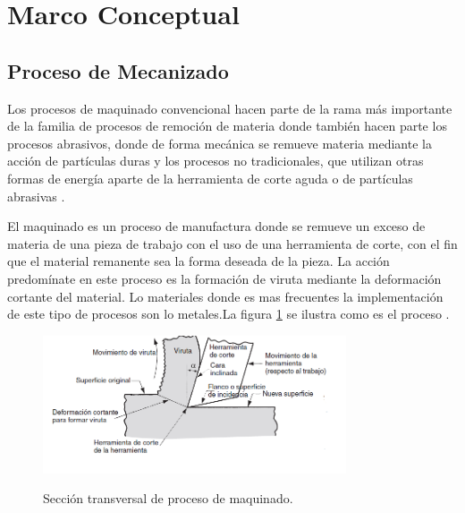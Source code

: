 \section{Marco Conceptual}
\subsection{Proceso de Mecanizado}
Los procesos de maquinado convencional hacen parte de la rama más importante de la familia de procesos de remoción de materia donde también hacen parte los procesos abrasivos, donde de forma mecánica se remueve materia mediante la acción de partículas duras y los procesos no tradicionales, que utilizan otras formas de energía aparte de la herramienta de corte aguda o de partículas abrasivas \citep{groover2007fundamentals}.

El maquinado es un proceso de manufactura donde se remueve un exceso de materia de una pieza de trabajo con el uso de una herramienta de corte, con el fin que el material remanente sea la forma deseada de la pieza. La acción predomínate en este proceso es la formación de viruta mediante la deformación cortante del material. Lo materiales donde es mas frecuentes la implementación de este tipo de procesos son lo metales.La figura \ref{ilustraciondelprocesodemecanizado} se ilustra como es el proceso \citep{groover2007fundamentals}.

\begin{figure}[hbt]
    \centering
    \includegraphics[width = 0.8\textwidth]{Cap1_FormulaciondelProyecto/Figuras/ilustraciondelprocesodemecanizado.PNG}
    \caption{Sección transversal de proceso de maquinado.}
    \citep{groover2007fundamentals}
    \label{ilustraciondelprocesodemecanizado}
\end{figure}


